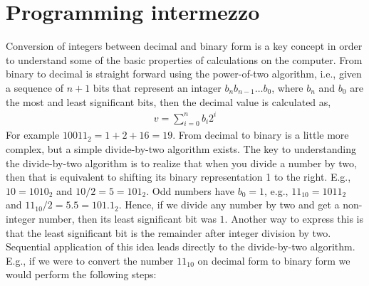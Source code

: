 \section{Programming intermezzo}
Conversion of integers between decimal and binary form is a key concept in order to understand some of the basic properties of calculations on the computer. From binary to decimal is straight forward using the power-of-two algorithm, i.e., given a sequence of $n+1$ bits that represent an intager $b_n b_{n-1}\dots b_0$, where $b_n$ and $b_0$ are the most and least significant bits, then the decimal value is calculated as,
\begin{align}
  v = \sum_{i=0}^nb_i2^i
\end{align}
For example $10011_2 = 1+2+16 = 19$. From decimal to binary is a little more complex, but a simple divide-by-two algorithm exists. The key to understanding the divide-by-two algorithm is to realize that when you divide a number by two, then that is equivalent to shifting its binary representation 1 to the right. E.g., $10 = 1010_2$ and $10/2 = 5 = 101_2$. Odd numbers have $b_0=1$, e.g., $11_{10} = 1011_2$ and $11_{10}/2 = 5.5 = 101.1_2$. Hence, if we divide any number by two and get a non-integer number, then its least significant bit was $1$. Another way to express this is that the least significant bit is the remainder after integer division by two. Sequential application of this idea leads directly to the divide-by-two algorithm. E.g., if we were to convert the number $11_{10}$ on decimal form to binary form we would perform the following steps:
